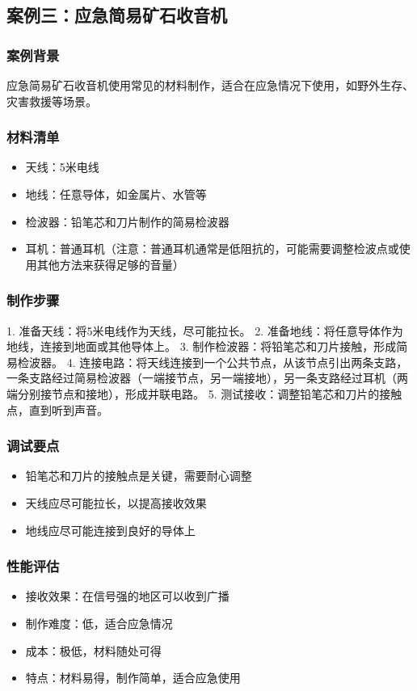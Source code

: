 \documentclass[12pt,UTF8]{ctexbook}
\begin{document}
\subsection{案例三：应急简易矿石收音机}

\subsubsection{案例背景}
应急简易矿石收音机使用常见的材料制作，适合在应急情况下使用，如野外生存、灾害救援等场景。

\subsubsection{材料清单}
\begin{itemize}
  \item 天线：5米电线
  \item 地线：任意导体，如金属片、水管等
  \item 检波器：铅笔芯和刀片制作的简易检波器
  \item 耳机：普通耳机（注意：普通耳机通常是低阻抗的，可能需要调整检波点或使用其他方法来获得足够的音量）
\end{itemize}

\subsubsection{制作步骤}
1. 准备天线：将5米电线作为天线，尽可能拉长。
2. 准备地线：将任意导体作为地线，连接到地面或其他导体上。
3. 制作检波器：将铅笔芯和刀片接触，形成简易检波器。
4. 连接电路：将天线连接到一个公共节点，从该节点引出两条支路，一条支路经过简易检波器（一端接节点，另一端接地），另一条支路经过耳机（两端分别接节点和接地），形成并联电路。
5. 测试接收：调整铅笔芯和刀片的接触点，直到听到声音。

\subsubsection{调试要点}
\begin{itemize}
  \item 铅笔芯和刀片的接触点是关键，需要耐心调整
  \item 天线应尽可能拉长，以提高接收效果
  \item 地线应尽可能连接到良好的导体上
\end{itemize}

\subsubsection{性能评估}
\begin{itemize}
  \item 接收效果：在信号强的地区可以收到广播
  \item 制作难度：低，适合应急情况
  \item 成本：极低，材料随处可得
  \item 特点：材料易得，制作简单，适合应急使用
\end{itemize}
\end{document}
